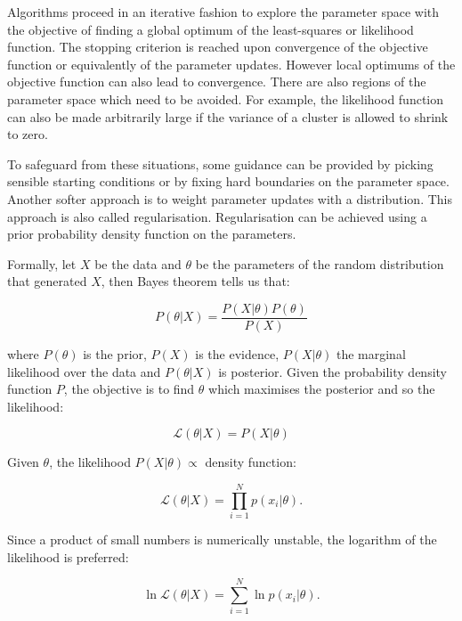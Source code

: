 Algorithms proceed in an iterative fashion to explore the parameter space with the objective of finding a global optimum of the
least-squares or likelihood function.
The stopping criterion is reached upon convergence of the objective function or equivalently of the parameter updates.
However local optimums of the objective function can also lead to convergence.
There are also regions of the parameter space which need to be avoided.
For example, the likelihood function can also be made arbitrarily large if the variance of a cluster is allowed to shrink to zero.

To safeguard from these situations,
some guidance can be provided by picking sensible starting conditions or by fixing hard boundaries on the parameter space.
Another softer approach is to weight parameter updates with a distribution.
This approach is also called regularisation.
Regularisation can be achieved using a prior probability density function on the parameters.

Formally, let $X$ be the data and $\theta$ be the parameters of the random distribution that generated $X$, then Bayes theorem tells us that:

\[
P(\theta|X) = \frac{P(X|\theta) P(\theta)}{P(X)}
\]

\noindent

where $P(\theta)$ is the prior, $P(X)$ is the evidence, $P(X|\theta)$ the marginal likelihood over the data and $P(\theta|X)$ is posterior.
Given the probability density function $P$, the objective is to find $\theta$ which maximises the posterior and so the likelihood:

\[
\mathcal{L}(\theta |X) = P(X | \theta)
\]

Given $\theta$, the likelihood $P(X|\theta) \propto $  density function:

\[
\mathcal{L}(\theta |X) = \prod_{i=1}^N p(x_i|\theta).
\]

Since a product of small numbers is numerically unstable, the logarithm of the likelihood is preferred:


\[
\ln \mathcal{L}(\theta |X) = \sum_{i=1}^N \ln p(x_i|\theta).
\]



%

